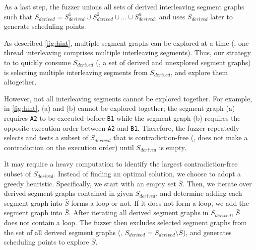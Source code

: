 


As a last step, the fuzzer unions all sets of derived interleaving
segment graphs such that
$S_{derived} = S^{1}_{derived} \cup S^{2}_{derived} \cup ... \cup
S^{n}_{derived}$, and uses $S_{derived}$ later to generate scheduling
points.




%
As described  \autoref{fig:hint}, multiple segment graphs can be
explored at a time (\ie, one thread interleaving comprises multiple
interleaving segments).
%
Thus, our strategy to to quickly consume $S_{derived}$ (\ie, a set of
derived and unexplored segment graphs) is selecting multiple
interleaving segments from $S_{derived}$, and explore them altogether.


However, not all interleaving segments cannot be explored together.
%
For example, in \autoref{fig:hint}, (a) and (b) cannot be explored
together; the segment graph (a) requires \texttt{A2} to be executed
before \texttt{B1} while the segment graph (b) requires the opposite
execution order between \texttt{A2} and \texttt{B1}.
%
Therefore, the fuzzer repeatedly selects and tests a subset of
$S_{derived}$ that is contradiction-free (\ie, does not make a
contradiction on the execution order) until $S_{derived}$ is empty.


It may require a heavy computation to identify the largest
contradiction-free subset of $S_{derived}$.
%
Instead of finding an optimal solution, we choose to adopt a greedy
heuristic.
%
Specifically, we start with an empty set $\bar{S}$. Then, we iterate
over derived segment graphs contained in given $S_{derived}$, and
determine adding each segment graph into $\bar{S}$ forms a loop or
not. If it does not form a loop, we add the segment graph into
$\bar{S}$.
%
After iterating all derived segment graphs in $S_{derived}$, $\bar{S}$
does not contain a loop. The fuzzer then excludes selected segment
graphs from the set of all derived segment graphs (\ie,
$S_{derived} = S_{derived} \setminus \bar{S}$), and generates
scheduling points to explore $\bar{S}$.









